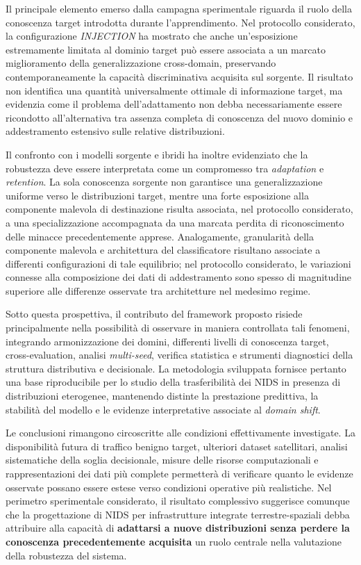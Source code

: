 Il principale elemento emerso dalla campagna sperimentale riguarda il ruolo della conoscenza target introdotta durante l'apprendimento.
Nel protocollo considerato, la configurazione \textit{INJECTION} ha mostrato che anche un'esposizione estremamente limitata al dominio target può essere associata a un marcato miglioramento della generalizzazione cross-domain, preservando contemporaneamente la capacità discriminativa acquisita sul sorgente.
Il risultato non identifica una quantità universalmente ottimale di informazione target, ma evidenzia come il problema dell'adattamento non debba necessariamente essere ricondotto all'alternativa tra assenza completa di conoscenza del nuovo dominio e addestramento estensivo sulle relative distribuzioni.

Il confronto con i modelli sorgente e ibridi ha inoltre evidenziato che la robustezza deve essere interpretata come un compromesso tra \textit{adaptation} e \textit{retention}.
La sola conoscenza sorgente non garantisce una generalizzazione uniforme verso le distribuzioni target, mentre una forte esposizione alla componente malevola di destinazione risulta associata, nel protocollo considerato, a una specializzazione accompagnata da una marcata perdita di riconoscimento delle minacce precedentemente apprese.
Analogamente, granularità della componente malevola e architettura del classificatore risultano associate a differenti configurazioni di tale equilibrio; nel protocollo considerato, le variazioni connesse alla composizione dei dati di addestramento sono spesso di magnitudine superiore alle differenze osservate tra architetture nel medesimo regime.

Sotto questa prospettiva, il contributo del framework proposto risiede principalmente nella possibilità di osservare in maniera controllata tali fenomeni, integrando armonizzazione dei domini, differenti livelli di conoscenza target, cross-evaluation, analisi \textit{multi-seed}, verifica statistica e strumenti diagnostici della struttura distributiva e decisionale.
La metodologia sviluppata fornisce pertanto una base riproducibile per lo studio della trasferibilità dei NIDS in presenza di distribuzioni eterogenee, mantenendo distinte la prestazione predittiva, la stabilità del modello e le evidenze interpretative associate al \textit{domain shift}.

Le conclusioni rimangono circoscritte alle condizioni effettivamente investigate.
La disponibilità futura di traffico benigno target, ulteriori dataset satellitari, analisi sistematiche della soglia decisionale, misure delle risorse computazionali e rappresentazioni dei dati più complete permetterà di verificare quanto le evidenze osservate possano essere estese verso condizioni operative più realistiche.
Nel perimetro sperimentale considerato, il risultato complessivo suggerisce comunque che la progettazione di NIDS per infrastrutture integrate terrestre-spaziali debba attribuire alla capacità di \textbf{adattarsi a nuove distribuzioni senza perdere la conoscenza precedentemente acquisita} un ruolo centrale nella valutazione della robustezza del sistema.
